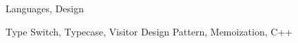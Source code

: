 \documentclass[preprint,10pt]{sigplanconf}
\begin{document}
\begin{abstract}
%
\end{abstract}


\terms
Languages, Design

\keywords
Type Switch, Typecase, Visitor Design Pattern, Memoization, C++







%

%













\end{document}
